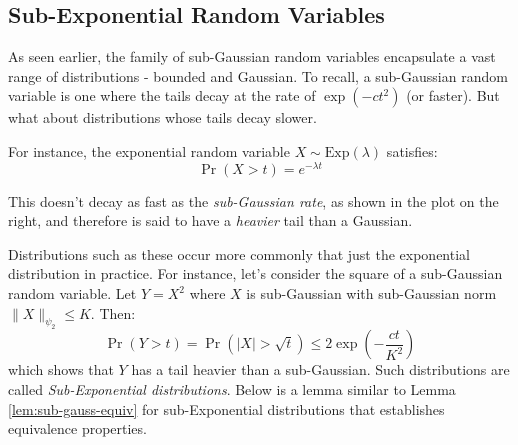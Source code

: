 \documentclass{article}
\theoremstyle{remark}
\begin{document}
\subsection{Sub-Exponential Random Variables}
As seen earlier, the family of sub-Gaussian random variables encapsulate a vast range of distributions - bounded and Gaussian. To recall, a sub-Gaussian random variable is one where the tails decay at the rate of \(\exp(-ct^{2})\) (or faster). But what about distributions whose tails decay slower.

\begin{minipage}{0.29\linewidth}
\end{minipage}
\hfill
\begin{minipage}{0.7\linewidth}
For instance, the exponential random variable \(X \sim \mathrm{Exp}(\lambda)\) satisfies:
\begin{equation*}
\Pr(X > t) = e^{-\lambda t}
\end{equation*}

This doesn't decay as fast as the \emph{sub-Gaussian rate}, as shown in the plot on the right, and therefore is said to have a \emph{heavier} tail than a Gaussian.
\end{minipage}

Distributions such as these occur more commonly that just the exponential distribution in practice. For instance, let's consider the square of a sub-Gaussian random variable. Let \(Y = X^{2}\) where \(X\) is sub-Gaussian with sub-Gaussian norm \(\|X\|_{\psi_{2}} \leq K\). Then:
\begin{equation*}
\Pr(Y > t) = \Pr(|X| > \sqrt{t}) \leq 2\exp\left(-\frac{ct}{K^{2}}\right)
\end{equation*}
which shows that \(Y\) has a tail heavier than a sub-Gaussian. Such distributions are called \emph{Sub-Exponential distributions}. Below is a lemma similar to Lemma \ref{lem:sub-gauss-equiv} for sub-Exponential distributions that establishes equivalence properties.
\end{document}
